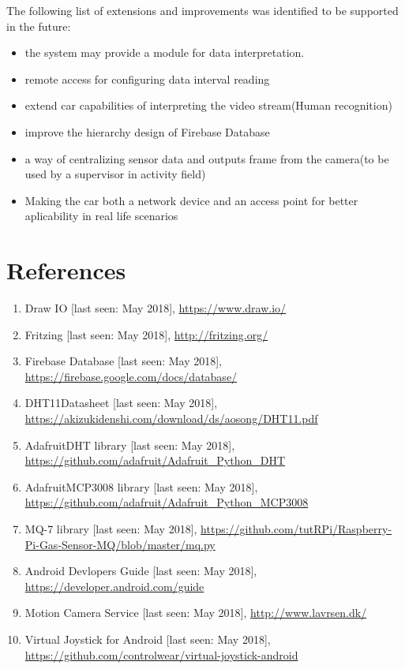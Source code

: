\documentclass[a4paper,11pt]{article}
\begin{document}
The following list of extensions and improvements was identified to be supported in the future:
\begin{itemize}  
\item the system may provide a module for data interpretation.
\item remote access for configuring data interval reading
\item extend car capabilities of interpreting the video stream(Human recognition)
\item improve the hierarchy design of Firebase Database
\item a way of centralizing sensor data and outputs frame from the camera(to be used by a supervisor in activity field)
\item Making the car both a network device and an access point for better aplicability in real life scenarios
\end{itemize}

\newpage
\section{References}
\begin{enumerate}
\item Draw IO [last seen: May 2018], \url{https://www.draw.io/}
\item Fritzing [last seen: May 2018], \url{http://fritzing.org/}
\item Firebase Database [last seen: May 2018], \url{https://firebase.google.com/docs/database/}
\item DHT11Datasheet [last seen: May 2018], \url{https://akizukidenshi.com/download/ds/aosong/DHT11.pdf}
\item AdafruitDHT library [last seen: May 2018], \url{https://github.com/adafruit/Adafruit\_Python\_DHT}
\item AdafruitMCP3008 library [last seen: May 2018], \url{https://github.com/adafruit/Adafruit\_Python\_MCP3008}
\item MQ-7 library [last seen: May 2018], \url{https://github.com/tutRPi/Raspberry-Pi-Gas-Sensor-MQ/blob/master/mq.py}
\item Android Devlopers Guide [last seen: May 2018], \url{https://developer.android.com/guide}
\item Motion Camera Service [last seen: May 2018], \url{http://www.lavrsen.dk/}
\item Virtual Joystick for Android [last seen: May 2018], \url{https://github.com/controlwear/virtual-joystick-android}
\end{enumerate}
\end{document}

